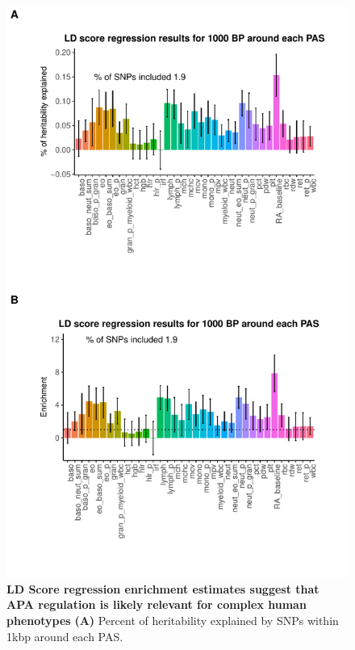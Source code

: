 \begin{figure}[!htb]
\centering
\includegraphics[width=5in]{img/ch02/Fig4_figuresupplement3.pdf}
\caption[LD Score regression enrichment estimates suggest that APA regulation is likely relevant for complex human phenotypes]{\textbf{LD Score regression enrichment estimates suggest that APA regulation is likely relevant for complex human phenotypes} {\bf (A)} Percent of heritability explained by SNPs within 1kbp around each PAS.}
\end{figure}


\begin{figure}[!htb]
\label{fig:ldregress}
\end{figure}
\clearpage

